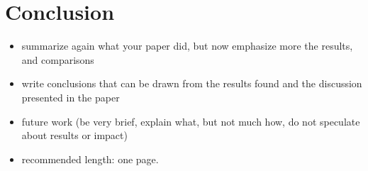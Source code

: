 \documentclass[]{ccs-thesis}
\begin{document}
\chapter{Conclusion}


\begin{itemize}
\item summarize again what your paper did, but now emphasize more the results, and comparisons
\item write conclusions that can be drawn from the results found and the discussion presented in the paper
\item future work (be very brief, explain what, but not much how, do not speculate about results or impact)
\item recommended length: one page.
\end{itemize}



\cleardoublepage

\listofabbreviations
\clearpage

\listoffigures
\clearpage

\listoftables
\clearpage

\printbibliography
\end{document}
